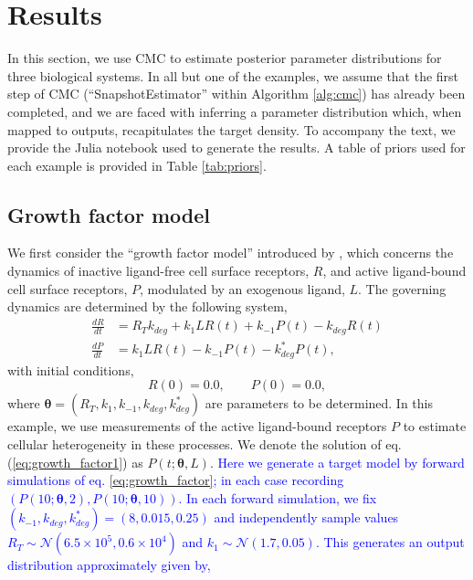 \section{Results}\label{sec:results}
In this section, we use CMC to estimate posterior parameter distributions for three biological systems. In all but one of the examples, we assume that the first step of CMC (``SnapshotEstimator'' within Algorithm \ref{alg:cmc}) has already been completed, and we are faced with inferring a parameter distribution which, when mapped to outputs, recapitulates the target density. To accompany the text, we provide the Julia notebook used to generate the results. A table of priors used for each example is provided in Table \ref{tab:priors}.


\subsection{Growth factor model}
We first consider the ``growth factor model'' introduced by \cite{dixit2018maximum}, which concerns the dynamics of inactive ligand-free cell surface receptors, $R$, and active ligand-bound cell surface receptors, $P$, modulated by an exogenous ligand, $L$. The governing dynamics are determined by the following system,
%
\begin{align}\label{eq:growth_factor}
\frac{dR}{dt} &= R_T k_{deg} + k_1 L R(t) + k_{-1} P(t) - k_{deg} R(t)\\
\label{eq:growth_factor1}
\frac{dP}{dt} &= k_1 L R(t) - k_{-1} P(t) - k^*_{deg} P(t),
\end{align}
with initial conditions,
\begin{equation*}
R(0) = 0.0, \qquad P(0) = 0.0,
\end{equation*}
%
where $\boldsymbol{\theta}=(R_T, k_1, k_{-1}, k_{deg}, k^*_{deg})$ are parameters to be determined. In this example, we use measurements of the active ligand-bound receptors $P$ to estimate cellular heterogeneity in these processes. We denote the solution of eq. (\ref{eq:growth_factor1}) as $P(t; \boldsymbol{\theta}, L)$. \textcolor{blue}{Here we generate a target model by forward simulations of eq. \eqref{eq:growth_factor}; in each case recording $(P(10; \boldsymbol{\theta}, 2), P(10; \boldsymbol{\theta}, 10))$. In each forward simulation, we fix $(k_{-1}, k_{deg}, k^*_{deg}) = (8, 0.015, 0.25)$ and independently sample values ${R_T\sim \mathcal{N}(6.5\times 10^5, 0.6\times 10^4)}$ and ${k_1\sim \mathcal{N}(1.7, 0.05)}$. This generates an output distribution approximately given by,}
%

